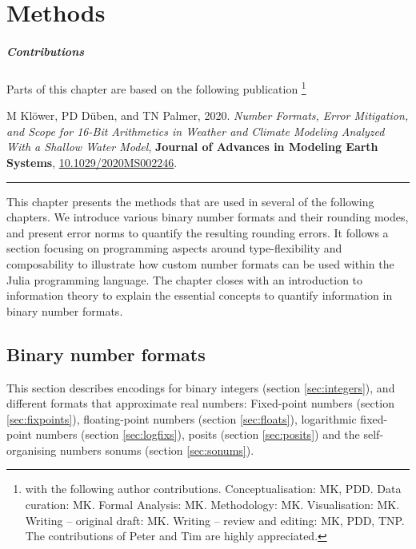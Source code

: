\chapter{Methods}
\label{chap:methods}

\paragraph{Contributions} \small Parts of this chapter are based on the following publication \footnote{with the following author contributions.
Conceptualisation: MK, PDD. Data curation: MK. Formal Analysis: MK. Methodology: MK. Visualisation: MK. Writing – original draft:
MK. Writing – review and editing: MK, PDD, TNP. The contributions of Peter and Tim are highly appreciated.}

\vspace{\baselineskip}
\indent M Klöwer, PD Düben, and TN Palmer, 2020. \emph{Number Formats, Error Mitigation, and Scope for 16-Bit Arithmetics in Weather and Climate Modeling Analyzed With a Shallow Water Model}, \textbf{Journal of Advances in Modeling Earth Systems}, \href{https://doi.org/10.1029/2020MS002246}{10.1029/2020MS002246}.
\vspace{\baselineskip}
\hrule
\vspace{\baselineskip}
\normalsize

This chapter presents the methods that are used in several of the following chapters. We introduce various binary number formats and
their rounding modes, and present error norms to quantify the resulting rounding errors. It follows a section focusing on
programming aspects around type-flexibility and composability to illustrate how custom number formats can be used within
the Julia programming language. The chapter closes with an introduction to information theory to explain the essential concepts
to quantify information in binary number formats.

\section{Binary number formats}
\label{sec:numbers}

This section describes encodings for binary integers (section \ref{sec:integers}), and different formats that approximate real numbers:
Fixed-point numbers (section \ref{sec:fixpoints}),
floating-point numbers (section \ref{sec:floats}),
logarithmic fixed-point numbers (section \ref{sec:logfixs}),
posits (section \ref{sec:posits}) and the self-organising numbers sonums (section \ref{sec:sonums}).

